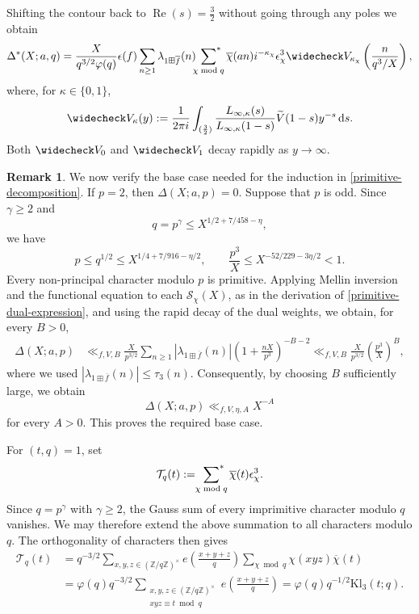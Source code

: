 \documentclass[11pt,reqno]{amsart}
\numberwithin{equation}{section}
\theoremstyle{plain}
\theoremstyle{definition}
\newtheorem{remark}{Remark}
\renewcommand{\Re}{\operatorname{Re}}
\newcommand{\Kl}{\mathrm{Kl}}
\begin{document}
Shifting the contour back to $\Re(s)=\frac{3}{2}$
without going through any poles we obtain
\begin{equation}\label{primitive-dual-expression}
\begin{split}
\Delta^{\ast}(X;a,q)=\frac{X}{q^{3/2}\varphi(q)}\epsilon(f)
\sum_{n\geq1}\lambda_{1\boxplus\overline f}(n)
\sideset{}{^\ast}\sum_{\chi\bmod q}
\overline{\chi}(an)i^{-\kappa_\chi}\epsilon_\chi^3
\widecheck V_{\kappa_\chi}
\left(\frac{n}{q^3/X}\right),
\end{split}
\end{equation}
where, for $\kappa\in\{0,1\}$,
\begin{equation*}\label{dual-weight-functions}
\widecheck V_\kappa(y)
:=\frac{1}{2\pi i}\int_{(\frac{3}{2})}\frac{L_{\infty,\kappa}(s)}{L_{\infty,\kappa}(1-s)}
\widetilde V(1-s)y^{-s}\,\mathrm{d}s.
\end{equation*}
Both $\widecheck V_0$ and $\widecheck V_1$ decay rapidly as
$y\to\infty$.
\begin{remark}\label{remark 2}
We now verify the base case needed for the induction in
\eqref{primitive-decomposition}. If $p=2$, then
$\Delta(X;a,p)=0$. Suppose that $p$ is odd. Since $\gamma\geq2$
and
\[
q=p^\gamma\leq X^{1/2+7/458-\eta},
\]
we have
\[
p\leq q^{1/2}\leq X^{1/4+7/916-\eta/2},
\qquad
\frac{p^3}{X}\leq X^{-52/229-3\eta/2}<1.
\]
Every non-principal character modulo $p$ is primitive. Applying
Mellin inversion and the functional equation to each
$\mathcal S_\chi(X)$, as in the derivation of
\eqref{primitive-dual-expression}, and using the rapid decay of the
dual weights, we obtain, for every $B>0$,
\[
\begin{split}
\Delta(X;a,p)
&\ll_{f,V,B}\frac{X}{p^{3/2}}\sum_{n\geq1}
|\lambda_{1\boxplus\overline f}(n)|
\left(1+\frac{nX}{p^3}\right)^{-B-2}\ll_{f,V,B}
\frac{X}{p^{3/2}}\left(\frac{p^3}{X}\right)^B,
\end{split}
\]
where we used
$|\lambda_{1\boxplus\overline f}(n)|\leq \tau_3(n)$.
Consequently, by choosing $B$ sufficiently large, we obtain
\[
\Delta(X;a,p)\ll_{f,V,\eta,A}X^{-A}
\]
for every $A>0$. This proves the required base case.
\end{remark}
For $(t,q)=1$, set
\[
\mathcal T_q(t)
:=\sideset{}{^\ast}\sum_{\chi\bmod q}
\overline{\chi}(t)\epsilon_\chi^3.
\]
Since $q=p^\gamma$ with $\gamma\geq2$, the Gauss sum of every
imprimitive character modulo $q$ vanishes. We may therefore extend
the above summation to all characters modulo $q$. 
The orthogonality of characters then gives
\begin{equation}\label{Gauss-Kloosterman-identity}
\begin{split}
\mathcal T_q(t)&=q^{-3/2}\sum_{x,y,z\in(\mathbb Z/q\mathbb Z)^\times}
e\left(\frac{x+y+z}{q}\right)\sum_{\chi\bmod q}\chi(xyz)\overline{\chi}(t)\\
&=\varphi(q)q^{-3/2}\sum_{\substack{x,y,z\in(\mathbb Z/q\mathbb Z)^\times\\xyz\equiv t\bmod q}}e\left(\frac{x+y+z}{q}\right)
=\varphi(q)q^{-1/2}\Kl_3(t;q).
\end{split}
\end{equation}
\end{document}
